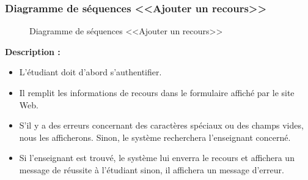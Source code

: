 \documentclass[12pt]{report}
\begin{document}
\newpage

\subsubsection{Diagramme de séquences <<Ajouter un recours>>}

\begin{figure}[h]
\centering
    \centerline{}
    \caption{Diagramme de séquences <<Ajouter un recours>>}
\end{figure}

\textbf{Description :}

\begin{itemize}
    \item L'étudiant doit d'abord s'authentifier.
    \item Il remplit les informations de recours dans le formulaire affiché par le site Web.
    \item S'il y a des erreurs concernant des caractères spéciaux ou des champs vides, nous les afficherons. Sinon, le système recherchera l'enseignant concerné.
    \item Si l'enseignant est trouvé, le système lui enverra le recours et affichera un message de réussite à l'étudiant sinon, il affichera un message d'erreur.
\end{itemize}
\end{document}
